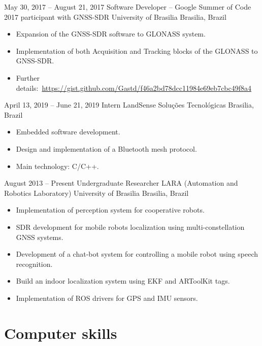 \documentclass[a4paper, 10pt, roman]{moderncv}        %
\begin{document}
\cventry
{May 30, 2017 -- August 21, 2017}
{Software Developer -- Google Summer of Code 2017 participant with GNSS-SDR}
{University of Brasilia}
{}
{Brasilia, Brazil}
{\begin{itemize}%
    \item Expansion of the GNSS-SDR software to GLONASS system.
    \item Implementation of both Acquisition and Tracking blocks of the GLONASS to GNSS-SDR.
    \item Further details:~\url{https://gist.github.com/Gastd/f46a2bd78dcc11984e69eb7cbc49f8a4}
    \end{itemize}}
\cventry
{April 13, 2019 -- June 21, 2019}
{Intern}
{LandSense Soluções Tecnológicas}
{Brasilia, Brazil}
{}
{\begin{itemize}%
    \item Embedded software development.
    \item Design and implementation of a Bluetooth mesh protocol.
    \item Main technology: C/C++.
    \end{itemize}}
\cventry
{August 2013 -- Present}
{Undergraduate Researcher}
{LARA (Automation and Robotics Laboratory)}
{University of Brasilia}
{Brasilia, Brazil}
{\begin{itemize}%
    \item Implementation of perception system for cooperative robots.
    \item SDR development for mobile robots localization using multi-constellation GNSS systems.
    \item Development of a \textquotedbl{}chat-bot\textquotedbl{} system for controlling a mobile robot using speech recognition.
    \item Build an indoor localization system using EKF and ARToolKit tags.
    \item Implementation of ROS drivers for GPS and IMU sensors.
    \end{itemize}}

\section{Computer skills}
\end{document}
